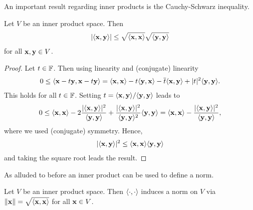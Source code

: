 \documentclass{article}
\begin{document}
An important result regarding inner products is the Cauchy-Schwarz inequality. 

\begin{proposition}
Let $V$ be an inner product space. Then 
\begin{align*}
    \vert \langle {\mathbf{x}},{\mathbf{y}} \rangle\vert \leq \sqrt{\langle {\mathbf{x}},{\mathbf{x}} \rangle}\sqrt{\langle {\mathbf{y}},{\mathbf{y}} \rangle}
\end{align*}
for all ${\mathbf{x}},{\mathbf{y}}\in V$.
\end{proposition}

\begin{proof}
Let $t\in {\mathbb{F}}$. Then using linearity and (conjugate) linearity
\begin{align*}
    0 \leq \langle {\mathbf{x}}-t{\mathbf{y}},{\mathbf{x}}-t{\mathbf{y}} \rangle = \langle {\mathbf{x}},{\mathbf{x}} \rangle - t\langle {\mathbf{y}},{\mathbf{x}} \rangle - \overline{t}\langle {\mathbf{x}},{\mathbf{y}} \rangle+ \vert t\vert^2 \langle {\mathbf{y}},{\mathbf{y}} \rangle.
\end{align*}
This holds for all $t\in {\mathbb{F}}$. Setting $t =\langle {\mathbf{x}},{\mathbf{y}} \rangle/\langle {\mathbf{y}},{\mathbf{y}} \rangle$ leads to 
\begin{align*}
    0 \leq   \langle {\mathbf{x}},{\mathbf{x}} \rangle - 2 \frac{\vert\langle {\mathbf{x}},{\mathbf{y}} \rangle\vert^2}{\langle {\mathbf{y}},{\mathbf{y}} \rangle}+ \frac{\vert\langle {\mathbf{x}},{\mathbf{y}} \rangle\vert^2}{\langle {\mathbf{y}},{\mathbf{y}} \rangle^2}\langle {\mathbf{y}},{\mathbf{y}} \rangle = \langle {\mathbf{x}},{\mathbf{x}} \rangle -  \frac{\vert\langle {\mathbf{x}},{\mathbf{y}} \rangle\vert^2}{\langle {\mathbf{y}},{\mathbf{y}} \rangle},
\end{align*}
where we used (conjugate) symmetry. Hence,
\begin{align*}
    \vert \langle {\mathbf{x}},{\mathbf{y}} \rangle\vert^2 \leq \langle {\mathbf{x}},{\mathbf{x}} \rangle\langle {\mathbf{y}},{\mathbf{y}} \rangle
\end{align*}
and taking the square root leads the result. 
\end{proof}

As alluded to before an inner product can be used to define a norm.

\begin{proposition}
Let $V$ be an inner product space. Then $\langle \cdot,\cdot \rangle$ induces a norm on $V$ via $\Vert {\mathbf{x}}\Vert =\sqrt{\langle {\mathbf{x}},{\mathbf{x}} \rangle} $ for all ${\mathbf{x}} \in V$.
\end{proposition}
\end{document}
